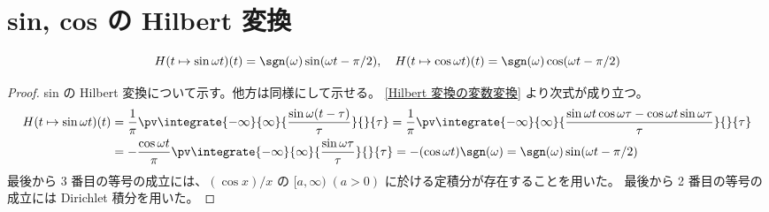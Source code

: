     \chapter{sin, cos の Hilbert 変換}
        \begin{shadebox}
            \[ H(t\mapsto\sin\omega t)(t) = \sgn(\omega)\sin(\omega t-\pi/2),\quad H(t\mapsto\cos\omega t)(t) = \sgn(\omega)\cos(\omega t-\pi/2) \]
        \end{shadebox}
        \begin{proof}
            \quad\par
            sin の Hilbert 変換について示す。他方は同様にして示せる。
            \ref{Hilbert 変換の変数変換} より次式が成り立つ。
            \begin{align*}
                H(t\mapsto\sin\omega t)(t) &= \frac{1}{\pi}\pv\integrate{-\infty}{\infty}{\frac{\sin\omega(t-\tau)}{\tau}}{}{\tau} = \frac{1}{\pi}\pv\integrate{-\infty}{\infty}{\frac{\sin\omega t\cos\omega\tau - \cos\omega t\sin\omega\tau}{\tau}}{}{\tau} \\
                &= -\frac{\cos\omega t}{\pi}\pv\integrate{-\infty}{\infty}{\frac{\sin\omega\tau}{\tau}}{}{\tau} = -(\cos\omega t)\sgn(\omega) = \sgn(\omega)\sin(\omega t-\pi/2)
            \end{align*}
            最後から 3 番目の等号の成立には、$(\cos x)/x$ の $[a,\infty)\;(a>0)$ に於ける定積分が存在することを用いた。
            最後から 2 番目の等号の成立には Dirichlet 積分を用いた。
        \end{proof}
